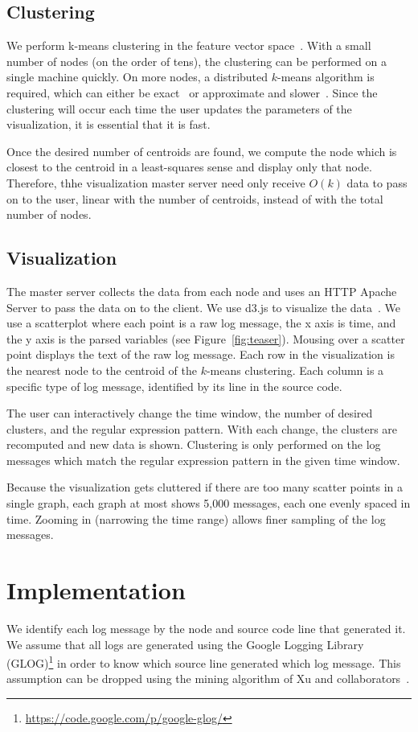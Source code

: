 \documentclass[conference]{style/acmsiggraph}
\begin{document}
\subsection{Clustering}
We perform k-means clustering in the feature vector space~\cite{kmeans,Lloyd82}.
With a small number of nodes (on the order of tens), the clustering can be performed on a single machine quickly.
On more nodes, a distributed $k$-means algorithm is required, which can either be exact~\cite{jin2006fast} or approximate and slower~\cite{kanungo2002local}.
Since the clustering will occur each time the user updates the parameters of the visualization, it is essential that it is fast.

Once the desired number of centroids are found, we compute the node which is closest to the centroid in a least-squares sense and display only that node.
Therefore, thhe visualization master server need only receive $O(k)$ data to pass on to the user, linear with the number of centroids, instead of with the total number of nodes.

\subsection{Visualization}
The master server collects the data from each node and uses an HTTP Apache Server to pass the data on to the client.
We use d3.js to visualize the data~\cite{D311}.
We use a scatterplot where each point is a raw log message, the x axis is time, and the y axis is the parsed variables (see Figure~\ref{fig:teaser}).
Mousing over a scatter point displays the text of the raw log message.
Each row in the visualization is the nearest node to the centroid of the $k$-means clustering.
Each column is a specific type of log message, identified by its line in the source code.

The user can interactively change the time window, the number of desired clusters, and the regular expression pattern. With each change, the clusters are recomputed and new data is shown. Clustering is only performed on the log messages which match the regular expression pattern in the given time window.

Because the visualization gets cluttered if there are too many scatter points in a single graph, each graph at most shows 5,000 messages, each one evenly spaced in time.
Zooming in (narrowing the time range) allows finer sampling of the log messages.


\section{Implementation}
We identify each log message by the node and source code line that generated it.
We assume that all logs are generated using the Google Logging Library (GLOG)\footnote{\url{https://code.google.com/p/google-glog/}} in order to know which source line generated which log message.
This assumption can be dropped using the mining algorithm of Xu and collaborators~\cite{Xu:2009:OSP:1674659.1677125}.
\end{document}
